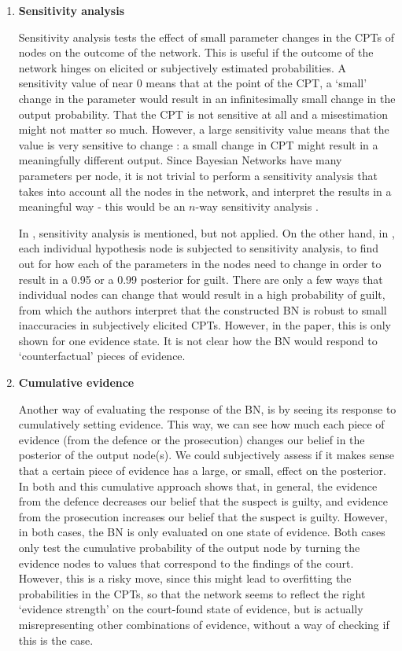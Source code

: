 \documentclass[12pt]{article}
\begin{document}
\begin{enumerate}

\item \textbf{Sensitivity analysis}

Sensitivity analysis tests the effect of small parameter changes in the CPTs of nodes on the outcome of the network. This is useful if the outcome of the network hinges on elicited or subjectively estimated probabilities. A sensitivity value of near 0 means that at the point of the CPT, a `small' change in the parameter would result in an infinitesimally small change in the output probability. That the CPT is not sensitive at all and a misestimation might not matter so much. However, a large sensitivity value means that the value is very sensitive to change : a small change in CPT might result in a meaningfully different output.  Since Bayesian Networks have many parameters per node, it is not trivial to perform a sensitivity analysis that takes into account all the nodes in the network, and interpret the results in a meaningful way - this would be an $n$-way sensitivity analysis \citep{gaag2007}.  

In \citet{vlek2016}, sensitivity analysis is mentioned, but not applied. On the other hand, in \citet{Fenton2019}, each individual hypothesis node is subjected to sensitivity analysis, to find out for how each of the parameters in the nodes need to change in order to result in a 0.95 or a 0.99 posterior for guilt. There are only a few ways that individual nodes can change that would result in a high probability of guilt, from which the authors interpret that the constructed BN is robust to small inaccuracies in subjectively elicited CPTs. However, in the paper, this is only shown for one evidence state. It is not clear how the BN would respond to `counterfactual' pieces of evidence.


\item \textbf{Cumulative evidence}

Another way of evaluating the response of the BN, is by seeing its response to cumulatively setting evidence. This way, we can see how much each piece of evidence (from the defence or the prosecution) changes our belief in the posterior of the output node(s). We could subjectively assess if it makes sense that a certain piece of evidence has a large, or small, effect on the posterior. In both \citep{Fenton2019} and \citep{vlek2016} this cumulative approach shows that, in general, the evidence from the defence decreases our belief that the suspect is guilty, and evidence from the prosecution increases our belief that the suspect is guilty. However, in both cases, the BN is only evaluated on one state of evidence. Both cases only test the cumulative probability of the output node by turning the evidence nodes to values that correspond to the findings of the court. However, this is a risky move, since this might lead to overfitting the probabilities in the CPTs, so that the network seems to reflect the right `evidence strength' on the court-found state of evidence, but is actually misrepresenting other combinations of evidence, without a way of checking if this is the case.




\end{enumerate}
\end{document}
